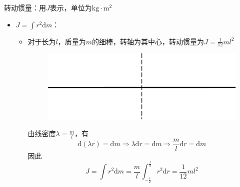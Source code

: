 \documentclass[12pt, a4paper, twoside]{ctexbook}
\begin{document}
{\sonti 转动惯量}：用$J$表示，单位为$\mathrm{kg}\cdot\mathrm{m}^2$
\begin{itemize}
    \item $J=\int r^2\mathrm{d}m$：
    \begin{itemize}
        \item 对于长为$l$，质量为$m$的细棒，转轴为其中心，转动惯量为$J=\frac{1}{12}ml^2$
        \begin{figure}[H]
            \centerline{\includegraphics[scale=0.6]{CH03FIG01.pdf}}
        \end{figure}
        由线密度$\lambda=\frac{m}{l}$，有
        $$
        \mathrm{d}\left(\lambda r\right)=\mathrm{d}m \Rightarrow \lambda\mathrm{d}r=\mathrm{d}m \Rightarrow \frac{m}{l}\mathrm{d}r=\mathrm{d}m
        $$
        因此
        $$
        J=\int r^2 \mathrm{d}m=\frac{m}{l}\int_{-\frac{l}{2}}^{\frac{l}{2}} r^2 \mathrm{d}r=\frac{1}{12}ml^2
        $$


\end{itemize}
\end{itemize}
\end{document}
